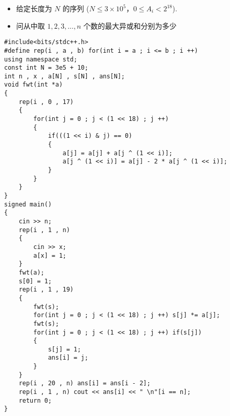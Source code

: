 \documentclass[E:/GsjzTle/main/main.tex]{subfiles}
\begin{document}
\begin{itemize}
\item
  给定长度为 \(N\) 的序列 (\(N≤3\times10^5\)，\(0≤A_i<2^{18}\)).
\item
  问从中取 \(1,2,3,...,n\) 个数的最大异或和分别为多少
\end{itemize}

\begin{lstlisting}
#include<bits/stdc++.h>
#define rep(i , a , b) for(int i = a ; i <= b ; i ++)
using namespace std;
const int N = 3e5 + 10;
int n , x , a[N] , s[N] , ans[N];
void fwt(int *a)
{
	rep(i , 0 , 17)
	{
		for(int j = 0 ; j < (1 << 18) ; j ++)
		{
			if(((1 << i) & j) == 0)
			{
				a[j] = a[j] + a[j ^ (1 << i)];
				a[j ^ (1 << i)] = a[j] - 2 * a[j ^ (1 << i)];
			}
		}
	}
}
signed main()
{
	cin >> n;
	rep(i , 1 , n)
	{
		cin >> x;
		a[x] = 1;
	}
	fwt(a);
	s[0] = 1;
	rep(i , 1 , 19)
	{
		fwt(s);
		for(int j = 0 ; j < (1 << 18) ; j ++) s[j] *= a[j];
		fwt(s);
		for(int j = 0 ; j < (1 << 18) ; j ++) if(s[j])
		{
			s[j] = 1;
			ans[i] = j;
		}
	}
	rep(i , 20 , n) ans[i] = ans[i - 2];
	rep(i , 1 , n) cout << ans[i] << " \n"[i == n];
	return 0;
}
\end{lstlisting}
\end{document}
